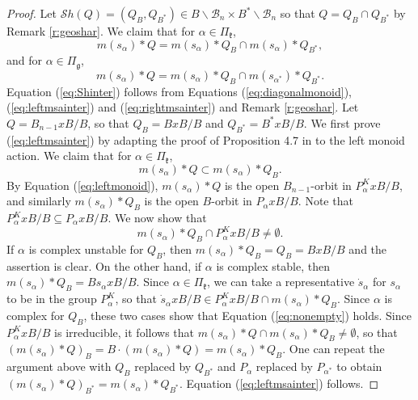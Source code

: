 \documentclass[12pt]{amsart}
\numberwithin{equation}{section}
\newcommand{\fk}{\mbox{${\mathfrak k}$}}
\newcommand{\fg}{\mbox{${\mathfrak g}$}}
\newcommand{\B}{\mathcal{B}}
\newcommand{\ms}{m(s_{\alpha})}
\newcommand{\Sh}{\mathcal{S}h}
\begin{document}
\begin{proof}

Let $\Sh(Q)=(Q_B, Q_{B^*})\in B\backslash\B_{n}\times B^{*}\backslash\B_{n}$ so that $Q=Q_B \cap Q_{B^*}$ by Remark \ref{r:geoshar}.
We claim that for $\alpha\in \Pi_{\fk}$,  
\begin{equation}\label{eq:leftmsainter}
\ms*Q=\ms*Q_{B}\cap\ms*Q_{B^{*}},
\end{equation}
and for $\alpha \in \Pi_{\fg}$,
\begin{equation}\label{eq:rightmsainter}
\ms*Q=\ms*Q_{B}\cap m(s_{\alpha^*})*Q_{B^{*}}.
\end{equation}
Equation (\ref{eq:Shinter}) follows from Equations (\ref{eq:diagonalmonoid}), (\ref{eq:leftmsainter}) and (\ref{eq:rightmsainter}) and Remark \ref{r:geoshar}.  Let 
$Q=B_{n-1}xB/B$, so that $Q_{B}=BxB/B$ and $Q_{B^{*}}=B^{*}xB/B.$  
We first prove (\ref{eq:leftmsainter}) by adapting the proof of Proposition 4.7 in \cite{CE21I} to the left monoid action.  We claim that for $\alpha \in \Pi_{\fk}$,
\begin{equation}\label{eq:firstinc}
\ms*Q\subset \ms*Q_{B}.
\end{equation}
By Equation (\ref{eq:leftmonoid}), $\ms*Q$ is the open $B_{n-1}$-orbit in $P_{\alpha}^{K} xB/B$, and similarly
$\ms*Q_{B}$ is the open $B$-orbit in $P_{\alpha} xB/B$.  Note that 
$P_{\alpha}^{K} x B/B\subseteq P_{\alpha} x B/B$.  We now show that 
\begin{equation}\label{eq:nonempty}
\ms*Q_{B}\cap P_{\alpha}^{K} x B/B\neq\emptyset.
\end{equation}
 If $\alpha$ is complex unstable for $Q_{B}$, then $\ms*Q_{B}=Q_{B}=BxB/B$ and the assertion is clear.  On the other hand, if $\alpha$ is complex stable, then $\ms*Q_{B}=B s_{\alpha} xB/B$.  Since $\alpha\in \Pi_{\fk}$, we can take a representative ${\dot{s}}_{\alpha}$ for $s_{\alpha}$ to be in the group $P_{\alpha}^{K}$, so that ${\dot{s}}_{\alpha}xB/B\in P_{\alpha}^{K}xB/B\cap \ms*Q_{B}$. Since $\alpha$ is complex for $Q_B$, these two cases show that Equation (\ref{eq:nonempty}) holds.  Since $P_{\alpha}^{K}xB/B$ is irreducible, it follows that $\ms*Q\cap\ms*Q_{B}\neq\emptyset$, so that $(\ms*Q)_{B}= B\cdot(\ms*Q)=\ms*Q_{B}$.  One can repeat the argument above with $Q_{B}$ replaced by $Q_{B^{*}}$ and $P_{\alpha}$ replaced by $P_{\alpha^{*}}$ to obtain $(\ms*Q)_{B^{*}}= \ms*Q_{B^{*}}$.  Equation (\ref{eq:leftmsainter}) follows.  
 


\end{proof}
\end{document}
